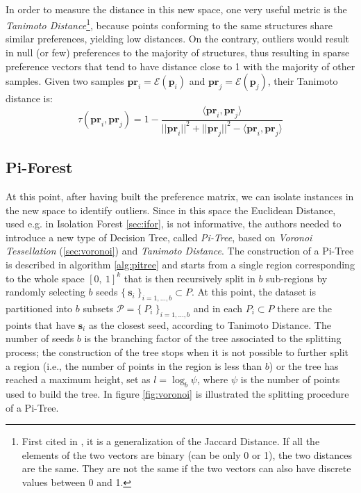 \paragraph{}
In order to measure the distance in this new space, one very useful metric is the \textit{Tanimoto Distance}\footnote{First cited in \cite{tanimoto}, it is a generalization of the Jaccard Distance. If all the elements of the two vectors are binary (can be only 0 or 1), the two distances are the same. They are not the same if the two vectors can also have discrete values between 0 and 1.}, because points conforming to the same structures share similar preferences, yielding low distances. On the contrary, outliers would result in null (or few) preferences to the majority of structures, thus resulting in sparse preference vectors that tend to have distance close to 1 with the majority of other samples. \newline
Given two samples $\textbf{pr}_i = \mathcal{E}(\textbf{p}_i)$ and $\textbf{pr}_j = \mathcal{E}(\textbf{p}_j)$, their Tanimoto distance is:
\begin{equation}
    \label{eq:tanimoto}
    \tau(\textbf{pr}_i, \textbf{pr}_j) = 1 - \frac{\langle \textbf{pr}_i, \textbf{pr}_j \rangle}{||\textbf{pr}_i||^2 + ||\textbf{pr}_j||^2 - \langle \textbf{pr}_i, \textbf{pr}_j \rangle}
\end{equation}

\subsection{Pi-Forest}

At this point, after having built the preference matrix, we can isolate instances in the new space to identify outliers. Since in this space the Euclidean Distance, used e.g. in Isolation Forest \ref{sec:ifor}, is not informative, the authors needed to introduce a new type of Decision Tree, called \textit{Pi-Tree}, based on \textit{Voronoi Tessellation} (\ref{sec:voronoi}) and \textit{Tanimoto Distance}. \newline
The construction of a Pi-Tree is described in algorithm \ref{alg:pitree} and starts from a single region corresponding to the whole space $[0,\ 1]^k$ that is then recursively split in $b$ sub-regions by randomly selecting $b$ seeds $\{\ \textbf{s}_i \ \}_{i=1,...,b} \subset P$. At this point, the dataset is partitioned into $b$ subsets $\mathcal{P} = \{\ P_i \ \}_{i=1,...,b}$ and in each $P_i \subset P$ there are the points that have $\textbf{s}_i$ as the closest seed, according to Tanimoto Distance. The number of seeds $b$ is the branching factor of the tree associated to the splitting process; the construction of the tree stops when it is not possible to further split a region (i.e., the number of points in the region is less than $b$) or the tree has reached a maximum height, set as $l = \log_b \psi$, where $\psi$ is the number of points used to build the tree. In figure \ref{fig:voronoi} is illustrated the splitting procedure of a Pi-Tree.

